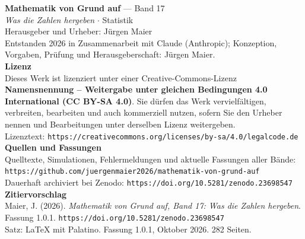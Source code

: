 \thispagestyle{empty}
\vspace*{\fill}
\begin{flushleft}
{\small\color{grau}
\textbf{\color{tief}Mathematik von Grund auf} --- Band 17\\[2pt]
\textit{Was die Zahlen hergeben} $\cdot$ Statistik\\[14pt]

Herausgeber und Urheber: Jürgen Maier\\[2pt]
Entstanden 2026 in Zusammenarbeit mit Claude (Anthropic); Konzeption, Vorgaben, Prüfung und Herausgeberschaft: Jürgen Maier.\\[14pt]

\textbf{Lizenz}\\[2pt]
Dieses Werk ist lizenziert unter einer Creative-Commons-Lizenz \textbf{Namensnennung -- Weitergabe unter gleichen Bedingungen 4.0 International (CC BY-SA 4.0)}. Sie dürfen das Werk vervielfältigen, verbreiten, bearbeiten und auch kommerziell nutzen, sofern Sie den Urheber nennen und Bearbeitungen unter derselben Lizenz weitergeben.\\[2pt]
Lizenztext: \texttt{https://creativecommons.org/licenses/by-sa/4.0/legalcode.de}\\[14pt]

\textbf{Quellen und Fassungen}\\[2pt]
Quelltexte, Simulationen, Fehlermeldungen und aktuelle Fassungen aller Bände:\\
\texttt{https://github.com/juergenmaier2026/mathematik-von-grund-auf}\\[2pt]
Dauerhaft archiviert bei Zenodo: \texttt{https://doi.org/10.5281/zenodo.23698547}\\[14pt]

\textbf{Zitiervorschlag}\\[2pt]
Maier, J. (2026). \textit{Mathematik von Grund auf, Band 17: Was die Zahlen hergeben}. Fassung 1.0.1. \texttt{https://doi.org/10.5281/zenodo.23698547}\\[14pt]

Satz: \LaTeX{} mit Palatino. Fassung 1.0.1, Oktober 2026. 282 Seiten.
}
\end{flushleft}
\vspace*{1.5cm}
